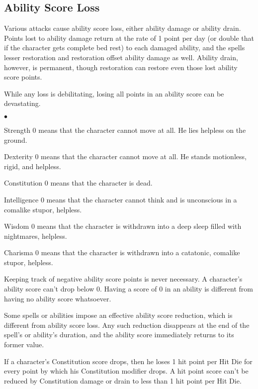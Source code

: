 \subsection{Ability Score Loss}

Various attacks cause ability score loss, either ability damage or ability drain. Points lost to ability damage return at the rate of 1 point per day (or double that if the character gets complete bed rest) to each damaged ability, and the spells lesser restoration and restoration offset ability damage as well. Ability drain, however, is permanent, though restoration can restore even those lost ability score points.

\vspace*{10pt}

\noindent While any loss is debilitating, losing all points in an ability score can be devastating.

\begin{list}{$\bullet$}{\itemspace}
	\item Strength 0 means that the character cannot move at all. He lies helpless on the ground.
	\item Dexterity 0 means that the character cannot move at all. He stands motionless, rigid, and helpless.
	\item Constitution 0 means that the character is dead.
	\item Intelligence 0 means that the character cannot think and is unconscious in a coma\textendash like stupor, helpless.
	\item Wisdom 0 means that the character is withdrawn into a deep sleep filled with nightmares, helpless.
	\item Charisma 0 means that the character is withdrawn into a catatonic, coma\textendash like stupor, helpless.
\end{list}

\vspace*{10pt}

Keeping track of negative ability score points is never necessary. A character's ability score can't drop below 0. Having a score of 0 in an ability is different from having no ability score whatsoever.

Some spells or abilities impose an effective ability score reduction, which is different from ability score loss. Any such reduction disappears at the end of the spell's or ability's duration, and the ability score immediately returns to its former value.

If a character's Constitution score drops, then he loses 1 hit point per Hit Die for every point by which his Constitution modifier drops. A hit point score can't be reduced by Constitution damage or drain to less than 1 hit point per Hit Die.

